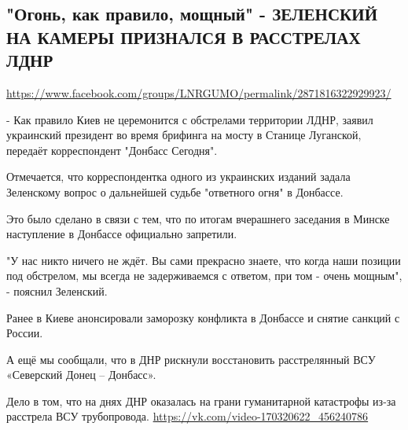  
 

\subsection{"Огонь, как правило, мощный" - ЗЕЛЕНСКИЙ НА КАМЕРЫ ПРИЗНАЛСЯ В РАССТРЕЛАХ ЛДНР}
\url{https://www.facebook.com/groups/LNRGUMO/permalink/2871816322929923/}


- Как правило Киев не церемонится с обстрелами территории ЛДНР, заявил
украинский президент во время брифинга на мосту в Станице Луганской, передаёт
корреспондент "Донбасс Сегодня".

Отмечается, что корреспондентка одного из украинских изданий задала Зеленскому
вопрос о дальнейшей судьбе "ответного огня" в Донбассе.

Это было сделано в связи с тем, что по итогам вчерашнего заседания в Минске
наступление в Донбассе официально запретили.

"У нас никто ничего не ждёт. Вы сами прекрасно знаете, что когда наши позиции
под обстрелом, мы всегда не задерживаемся с ответом, при том - очень мощным", -
пояснил Зеленский.

Ранее в Киеве анонсировали заморозку конфликта в Донбассе и снятие санкций с
России.

А ещё мы сообщали, что в ДНР рискнули восстановить расстрелянный ВСУ «Северский
Донец – Донбасс».

Дело в том, что на днях ДНР оказалась на грани гуманитарной катастрофы из-за
расстрела ВСУ трубопровода.  \url{https://vk.com/video-170320622_456240786}
  
